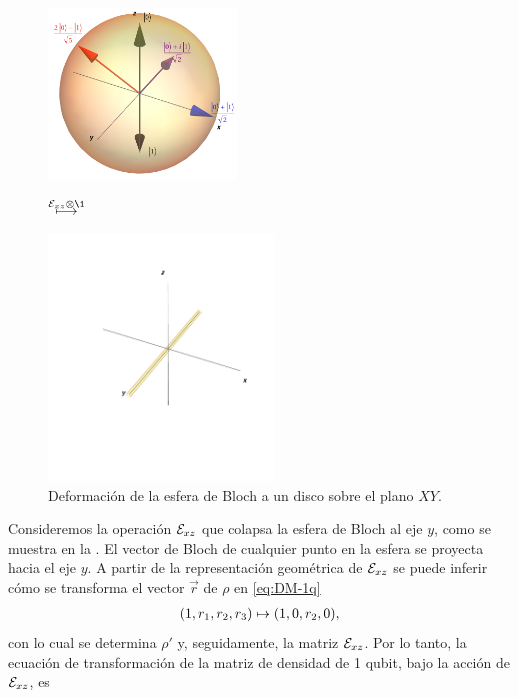 \begin{figure} %
    \centering
    \begin{minipage}{.4\textwidth}
        \centering
        \includegraphics[width=5cm]
        {img-congreso/bloch.png}
    \end{minipage}
    $\stackrel{\E_{xz}\otimes\1 \vspace{1cm}}{\longmapsto}$
    \begin{minipage}{0.4\textwidth}
        \centering
        \includegraphics[width=6cm]
        {img-congreso/lineY}
    \end{minipage}
    \caption{Deformación de la esfera de Bloch a un disco sobre el plano $XY$.}
    \label{fig:QC-ex2}
\end{figure} %
Consideremos la operación $\mathcal{E}_{xz}$ que colapsa la esfera de Bloch
al eje $y$, como se muestra en la . El vector de 
Bloch de cualquier punto en la esfera se proyecta hacia el eje $y$.
A partir de la representación geométrica de $\mathcal{E}_{xz}$ 
se puede inferir cómo se transforma el vector $\vec{r}$
de $\rho$ en \eqref{eq:DM-1q}
\begin{align}
\qty(1,r_1,r_2,r_3)\mapsto\qty(1,0,r_2,0),
\label{eq:Bloch-vec-mapToY}
\end{align}
con lo cual se determina $\rho'$ y, seguidamente,
la matriz $\mathcal{E}_{xz}$.
Por lo tanto, la ecuación de transformación de la matriz 
de densidad de 1 qubit, bajo la acción de $\mathcal{E}_{xz}$, es
